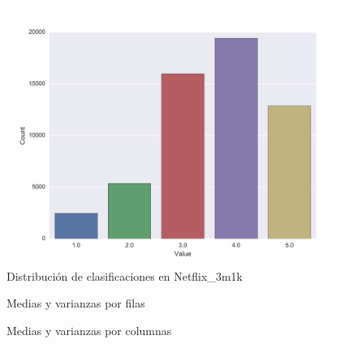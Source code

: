\begin{figure}[ht]
    \centering
    \includegraphics[width=0.4\linewidth]{../Results/Netflix/Plots/Data_distribution.png}
    \caption{Distribución de clasificaciones en Netflix\_3m1k}\label{fig:netflix_data_distribution}
\end{figure}

\begin{figure}[ht]
    \centering
    \caption{Medias y varianzas por filas}\label{fig:means_and_vars_by_row}
\end{figure}

\begin{figure}[ht]
    \centering
    \caption{Medias y varianzas por columnas}\label{fig:means_and_vars_by_col}
\end{figure}


